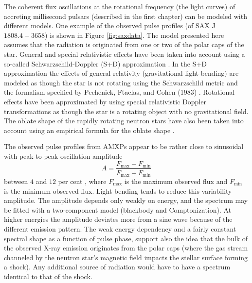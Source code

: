 \documentclass{wihuri}
\def\be{\begin{equation}}
\def\ee{\end{equation}}
\def\source{SAX J$1808.4-3658$}
\begin{document}
The coherent flux oscillations at the rotational frequency (the light curves) of accreting millisecond pulsars (described in the first chapter) can be modeled with different models. One example of the observed pulse profiles (of \source) is shown in Figure \ref{fig:saxdata}. The model presented here assumes that the radiation is originated from one or two of the polar caps of the star. General and special relativistic effects have been taken into account using a so-called Schwarzschild-Doppler (S+D) approximation %
\cite{millerlamb98}%
\cite{poutagierlinskisax}. In the S+D approximation the effects of general relativity (gravitational light-bending) are modeled as though the star is not rotating using the Schwarzschild metric and the formalism specified by
Pechenick, Ftaclas, and Cohen (1983) \cite{pechenick}. Rotational effects have been approximated by using special relativistic Doppler transformations as though the star is a rotating object with no gravitational field. The oblate shape of the rapidly rotating neutron stars have also been taken into account using an empirical formula for the oblate shape \cite{algendy} \cite{morsink}.


The observed pulse profiles from AMXPs appear to be rather close to sinusoidal with peak-to-peak oscillation amplitude 
\be \label{eq:amplitude}
A = \frac{F_{\mathrm{max}} - F_{\mathrm{min}}} {F_{\mathrm{max}} + F_{\mathrm{min}}}
\ee %
 between $4$ and $12$ per cent \cite{poutarew2006}, where $F_{\mathrm{max}}$ is the maximum observed flux and $F_{\mathrm{min}}$ is the minimum observed flux. Light bending tends %
to reduce this variability amplitude. The amplitude depends only weakly on energy, and the spectrum may be fitted with a two-component model (blackbody and Comptonization). At higher energies the amplitude deviates more from a sine wave because of the different emission pattern. The weak energy dependency and a fairly constant spectral shape as a function of pulse phase, support also the idea that the bulk of the observed X-ray emission originates from the polar caps (where the gas stream channeled by the neutron star's magnetic field impacts the stellar surface forming a shock). Any additional source of radiation would have to have a spectrum identical to that of the shock.
\end{document}
